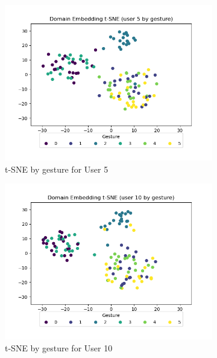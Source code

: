\begin{figure}[b]
\begin{subfigure}{0.3\textwidth}
		\includegraphics[width=\textwidth]{figures/extended/long_de_u5}
		\caption{t-SNE by gesture for User 5}
	\end{subfigure}
	\hfill
	\begin{subfigure}{0.3\textwidth}
		\centering
		\includegraphics[width=\textwidth]{figures/extended/long_de_u10}
		\caption{t-SNE by gesture for User 10}
	\end{subfigure}
	\hfill
	\begin{subfigure}{0.3\textwidth}
		\centering

\end{subfigure}
\end{figure}
